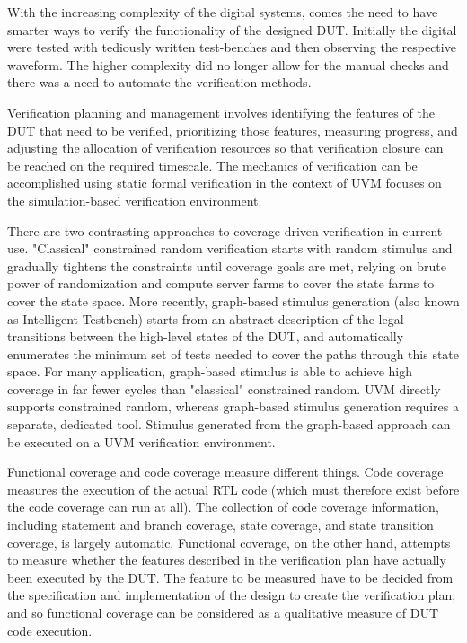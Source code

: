\documentclass[a4paper,11pt]{article}
\begin{document}
With the increasing complexity of the digital systems, comes the need to have smarter ways to verify the functionality of the designed DUT. Initially the digital were tested with tediously written test-benches and then observing the respective waveform. The higher complexity did no longer allow for the manual checks and there was a need to automate the verification methods.\cite{doulos}

Verification planning and management involves identifying the features of the DUT that need to be verified, prioritizing those features, measuring progress, and adjusting the allocation of verification resources so that verification closure can be reached on the required timescale. The mechanics of verification can be accomplished using static formal verification in the context of UVM focuses on the simulation-based verification environment.\cite{doulos}

There are two contrasting approaches to coverage-driven verification in current use. "Classical" constrained random verification starts with random stimulus and gradually tightens the constraints until coverage goals are met, relying on brute power of randomization and compute server farms to cover the state farms to cover the state space. More recently, graph-based stimulus generation (also known as Intelligent Testbench) starts from an abstract description of the legal transitions between the high-level states of the DUT, and automatically enumerates the minimum set of tests needed to cover the paths through this state space. For many application, graph-based stimulus is able to achieve high coverage in far fewer cycles than "classical" constrained random. UVM directly supports constrained random, whereas graph-based stimulus generation requires a separate, dedicated tool. Stimulus generated from the graph-based approach can be executed on a UVM verification environment.\cite{doulos}

Functional coverage and code coverage measure different things. Code coverage measures the execution of the actual RTL code (which must therefore exist before the code coverage can run at all). The collection of code coverage information, including statement and branch coverage, state coverage, and state transition coverage, is largely automatic. Functional coverage, on the other hand, attempts to measure whether the features described in the verification plan have actually been executed by the DUT. The feature to be measured have to be decided from the specification and implementation of the design to create the verification plan, and so functional coverage can be considered as a qualitative measure of DUT code execution.\cite{doulos}
\end{document}
